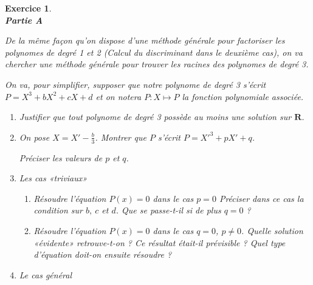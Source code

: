 \documentclass[11pt,a4paper,french]{article}
\newcommand{\R}{\mathbf{R}}
\theoremstyle{break}
\theoremstyle{plain}
\newtheorem{exerciceT}{Exercice}
\theoremstyle{nonumberplain}
\theoremstyle{nonumberbreak}
\newenvironment{exercice}{\begin{framed}\begin{exerciceT}}{\end{exerciceT}\end{framed}}
\begin{document}
\begin{exercice}~\\
  \noindent\textbf{Partie A}

  De la même façon qu'on dispose d'une méthode générale pour factoriser
  les polynomes de degré 1 et 2 (Calcul du discriminant dans le deuxième
  cas), on va chercher une méthode générale pour trouver les racines des
  polynomes de degré 3.

  On va, pour simplifier, supposer que notre polynome de degré 3 s'écrit
  $P = X^3 + bX^2 + cX + d$ et on notera $P: X \mapsto P$ la fonction
  polynomiale associée.

  \begin{enumerate}
    \item Justifier que tout polynome de degré 3 possède au moins une
      solution sur $\R$.
    \item On pose $X = X' - \frac{b}3$. Montrer que $P$ s'écrit $P =
      X'^3 + pX' + q$.

      Préciser les valeurs de $p$ et $q$.
    \item Les cas «triviaux»
      \begin{enumerate}
        \item Résoudre l'équation $P(x) = 0$ dans le cas $p = 0$
          Préciser dans ce cas la condition sur $b,\ c$ et $d$.
          Que se passe-t-il si de plus $q=0$ ?
        \item Résoudre l'équation $P(x) = 0$ dans le cas $q = 0$, $p
          \neq 0$.
          Quelle solution «évidente» retrouve-t-on ? Ce résultat
          était-il prévisible ?
          Quel type d'équation doit-on ensuite résoudre ?
      \end{enumerate}
    \item Le cas général


\end{enumerate}
\end{exercice}
\end{document}
